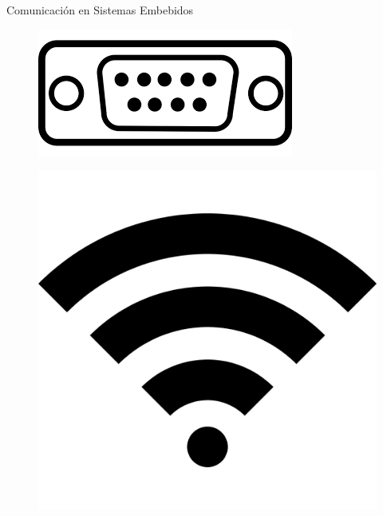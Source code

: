 \documentclass{beamer}
\begin{document}
	\begin{frame}{Comunicación en Sistemas Embebidos}
		\begin{multicols}{3}
			\begin{figure}
				\centering
				\includegraphics[scale=0.31]{serial}
			\end{figure}
			\begin{figure}
				\centering
				\includegraphics[scale=0.2]{wifi}
			\end{figure}
			\begin{figure}
				\centering

\end{figure}
\end{multicols}
\end{frame}
\end{document}
